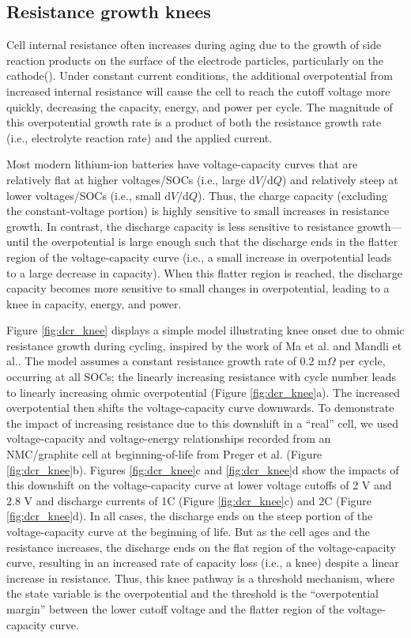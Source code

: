 \documentclass[journal=jpcl, manuscript=article, layout=onecolumn]{achemso}
\begin{document}
\subsection{Resistance growth knees}

Cell internal resistance often increases during aging due to the growth of side reaction products on the surface of the electrode particles, particularly on the cathode(). Under constant current conditions, the additional overpotential from increased internal resistance will cause the cell to reach the cutoff voltage more quickly, decreasing the capacity, energy, and power per cycle. The magnitude of this overpotential growth rate is a product of both the resistance growth rate (i.e., electrolyte reaction rate) and the applied current.

Most modern lithium-ion batteries have voltage-capacity curves that are relatively flat at higher voltages/SOCs (i.e., large d$V$/d$Q$) and relatively steep at lower voltages/SOCs (i.e., small d$V$/d$Q$). Thus, the charge capacity (excluding the constant-voltage portion) is highly sensitive to small increases in resistance growth. In contrast, the discharge capacity is less sensitive to resistance growth---until the overpotential is large enough such that the discharge ends in the flatter region of the voltage-capacity curve (i.e., a small increase in overpotential leads to a large decrease in capacity). When this flatter region is reached, the discharge capacity becomes more sensitive to small changes in overpotential, leading to a knee in capacity, energy, and power.

Figure \ref{fig:dcr_knee} displays a simple model illustrating knee onset due to ohmic resistance growth during cycling, inspired by the work of Ma et al.\cite{ma_editors_2019} and Mandli et al.\cite{mandli_analysis_2019}. The model assumes a constant resistance growth rate of 0.2 m$\Omega$ per cycle, occurring at all SOCs; the linearly increasing resistance with cycle number leads to linearly increasing ohmic overpotential (Figure \ref{fig:dcr_knee}a). The increased overpotential then shifts the voltage-capacity curve downwards.
To demonstrate the impact of increasing resistance due to this downshift in a ``real'' cell, we used voltage-capacity and voltage-energy relationships recorded from an NMC/graphite cell at beginning-of-life from Preger et al.\cite{preger_degradation_2020} (Figure \ref{fig:dcr_knee}b). Figures \ref{fig:dcr_knee}c and \ref{fig:dcr_knee}d show the impacts of this downshift on the voltage-capacity curve at lower voltage cutoffs of 2 V and 2.8 V and discharge currents of 1C (Figure \ref{fig:dcr_knee}c) and 2C (Figure \ref{fig:dcr_knee}d). In all cases, the discharge ends on the steep portion of the voltage-capacity curve at the beginning of life. But as the cell ages and the resistance increases, the discharge ends on the flat region of the voltage-capacity curve, resulting in an increased rate of capacity loss (i.e., a knee) despite a linear increase in resistance. Thus, this knee pathway is a threshold mechanism, where the state variable is the overpotential and the threshold is the ``overpotential margin'' between the lower cutoff voltage and the flatter region of the voltage-capacity curve.
\end{document}
